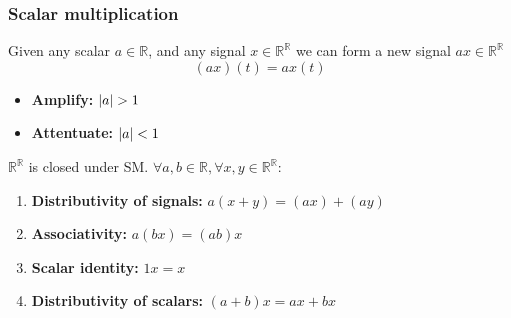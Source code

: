     \subsubsection{Scalar multiplication}
    \begin{definition}
        Given any scalar $a \in \mathbb{R}$, and any signal $x \in \mathbb{R}^{\mathbb{R}}$ we can form a new signal $ax \in \mathbb{R}^{\mathbb{R}}$
        \begin{equation}
            (ax)(t) = ax(t)
        \end{equation}
        \begin{itemize}
            \item \textbf{Amplify:} $\abs{a}>1$
            \item \textbf{Attentuate:} $\abs{a}<1$
        \end{itemize}
        \vspace{1em}

        $\mathbb{R}^\mathbb{R}$ is closed under SM. $\forall a,b \in \mathbb{R}, \forall x,y \in \mathbb{R}^{\mathbb{R}}$:
        \begin{enumerate}
            \item \textbf{Distributivity of signals:} $a(x+y) = (ax) + (ay)$
            \item \textbf{Associativity:} $a(bx) = (ab)x$
            \item \textbf{Scalar identity:} $1x=x$
            \item \textbf{Distributivity of scalars:} $(a+b)x = ax + bx$
        \end{enumerate}
    \end{definition}